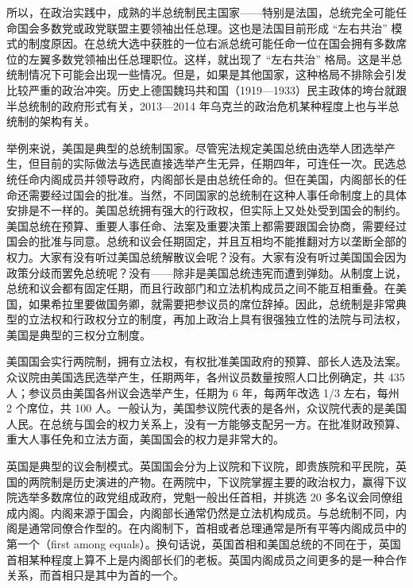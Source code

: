 所以，在政治实践中，成熟的半总统制民主国家——特别是法国，总统完全可能任命国会多数党或政党联盟主要领袖出任总理。这也是法国目前形成 “左右共治” 模式的制度原因。在总统大选中获胜的一位右派总统可能任命一位在国会拥有多数席位的左翼多数党领袖出任总理职位。这样，就出现了 “左右共治” 格局。这是半总统制情况下可能会出现一些情况。但是，如果是其他国家，这种格局不排除会引发比较严重的政治冲突。历史上德国魏玛共和国（1919—1933）民主政体的垮台就跟半总统制的政府形式有关，2013—2014 年乌克兰的政治危机某种程度上也与半总统制的架构有关。

举例来说，美国是典型的总统制国家。尽管宪法规定美国总统由选举人团选举产生，但目前的实际做法与选民直接选举产生无异，任期四年，可连任一次。民选总统任命内阁成员并领导政府，内阁部长是由总统任命的。但在美国，内阁部长的任命还需要经过国会的批准。当然，不同国家的总统制在这种人事任命制度上的具体安排是不一样的。美国总统拥有强大的行政权，但实际上又处处受到国会的制约。美国总统在预算、重要人事任命、法案及重要决策上都需要跟国会协商，需要经过国会的批准与同意。总统和议会任期固定，并且互相均不能推翻对方以垄断全部的权力。大家有没有听过美国总统解散议会呢？没有。大家有没有听过美国国会因为政策分歧而罢免总统呢？没有——除非是美国总统违宪而遭到弹劾。从制度上说，总统和议会都有固定任期，而且行政部门和立法机构成员之间不能互相重叠。在美国，如果希拉里要做国务卿，就需要把参议员的席位辞掉。因此，总统制是非常典型的立法权和行政权分立的制度，再加上政治上具有很强独立性的法院与司法权，美国是典型的三权分立制度。

美国国会实行两院制，拥有立法权，有权批准美国政府的预算、部长人选及法案。众议院由美国选民选举产生，任期两年，各州议员数量按照人口比例确定，共 435 人；参议员由美国各州议会选举产生，任期为 6 年，每两年改选 1/3 左右，每州 2 个席位，共 100 人。一般认为，美国参议院代表的是各州，众议院代表的是美国人民。在总统与国会的权力关系上，没有一方能够支配另一方。在批准财政预算、重大人事任免和立法方面，美国国会的权力是非常大的。

英国是典型的议会制模式。英国国会分为上议院和下议院，即贵族院和平民院，英国的两院制是历史演进的产物。在两院中，下议院掌握主要的政治权力，赢得下议院选举多数席位的政党组成政府，党魁一般出任首相，并挑选 20 多名议会同僚组成内阁。内阁来源于国会，内阁部长通常仍然是立法机构成员。与总统制不同，内阁是通常同僚合作型的。在内阁制下，首相或者总理通常是所有平等内阁成员中的第一个（first among equals）。换句话说，英国首相和美国总统的不同在于，英国首相某种程度上算不上是内阁部长们的老板。英国内阁成员之间更多的是一种合作关系，而首相只是其中为首的一个。

